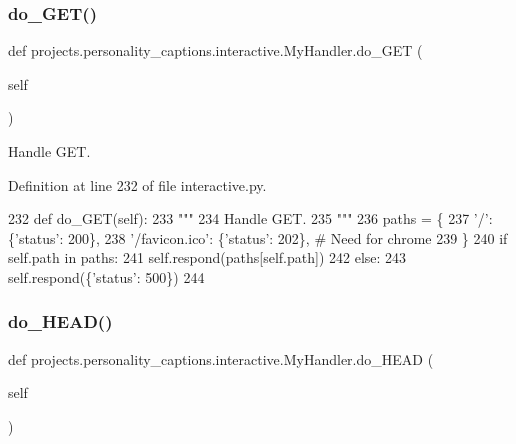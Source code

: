 \subsubsection{\texorpdfstring{do\+\_\+\+G\+E\+T()}{do\_GET()}}
{\footnotesize\ttfamily def projects.\+personality\+\_\+captions.\+interactive.\+My\+Handler.\+do\+\_\+\+G\+ET (\begin{DoxyParamCaption}\item[{}]{self }\end{DoxyParamCaption})}

\begin{DoxyVerb}Handle GET.
\end{DoxyVerb}
 

Definition at line 232 of file interactive.\+py.


\begin{DoxyCode}
232     \textcolor{keyword}{def }do\_GET(self):
233         \textcolor{stringliteral}{"""}
234 \textcolor{stringliteral}{        Handle GET.}
235 \textcolor{stringliteral}{        """}
236         paths = \{
237             \textcolor{stringliteral}{'/'}: \{\textcolor{stringliteral}{'status'}: 200\},
238             \textcolor{stringliteral}{'/favicon.ico'}: \{\textcolor{stringliteral}{'status'}: 202\},  \textcolor{comment}{# Need for chrome}
239         \}
240         \textcolor{keywordflow}{if} self.path \textcolor{keywordflow}{in} paths:
241             self.respond(paths[self.path])
242         \textcolor{keywordflow}{else}:
243             self.respond(\{\textcolor{stringliteral}{'status'}: 500\})
244 
\end{DoxyCode}
\mbox{\label{classprojects_1_1personality__captions_1_1interactive_1_1MyHandler_a51c600da08cf2f01d860f4a4c500e827}} 
\subsubsection{\texorpdfstring{do\+\_\+\+H\+E\+A\+D()}{do\_HEAD()}}
{\footnotesize\ttfamily def projects.\+personality\+\_\+captions.\+interactive.\+My\+Handler.\+do\+\_\+\+H\+E\+AD (\begin{DoxyParamCaption}\item[{}]{self }\end{DoxyParamCaption})}

